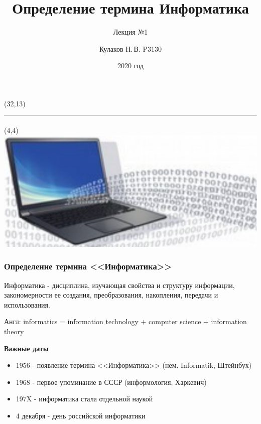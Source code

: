 \documentclass[aspectratio=169, 11pt]{beamer}
\title{Определение термина Информатика}
\subtitle{Лекция №1}
\author{Кулаков Н.\,В. P3130}
\date{2020 год}
\institute{Факультет ПИиКТ}
\begin{document}
		
	\begin{frame}
		\maketitle
	\end{frame}


	\begin{frame}
		
		\begin{textblock}{50}(32,13)
			\includegraphics[scale=0.4]{Screenshot_1.png}
		\end{textblock}
		
		\begin{textblock}{50}(4,4)
			\includegraphics[scale=0.25]{Screenshot_2.png}
		\end{textblock}
		

		\frametitle{\textbf{\textcolor[rgb]{0.4,0.4,0.4}{\textcolor[rgb]{0,0,1}{О}пределение термина <<Информатика>>}}}
		
		\textcolor[rgb]{0,0.64,0.09}{Информатика} - дисциплина, изучающая свойства и структуру информации, закономерности ее создания, преобразования, накопления, передачи и использования.
		
		\textcolor[rgb]{0,0.64,0.09}{Англ}: informatics = information technology $+$ computer science $ + $ information theory
\vspace{3mm}
	
		\begin{center}
			\textbf{Важные даты}
		\end{center}
	\begin{itemize}
		\item1956 - появление термина <<Информатика>> (нем. Informatik, Штейнбух)
		
		\item1968 - первое упоминание в СССР (информология, Харкевич)
		
		\item197X - информатика стала отдельной наукой
		
		\item4 декабря - день российской информатики
	\end{itemize}
	\end{frame}
	
\end{document}
